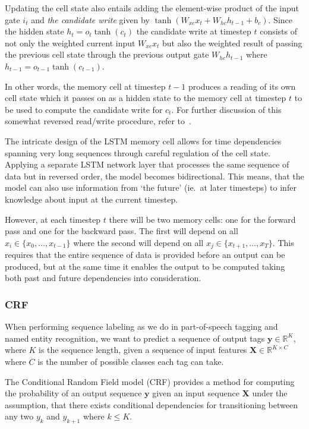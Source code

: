 Updating the cell state also entails adding the element-wise product of the
input gate $i_{t}$ and \textit{the candidate write} given by $\tanh(W_{xc}x_{t}
+ W_{hc}h_{t-1} + b_{c})$. Since the hidden state $h_{t} = o_{t}\tanh(c_{t})$
the candidate write at timestep $t$ consists of not only the weighted current
input $W_{xc}x_{t}$ but also the weighted result of passing the previous cell
state through the previous output gate $W_{hc}h_{t-1}$ where $h_{t-1} =
o_{t-1}\tanh(c_{t-1})$.

In other words, the memory cell at timestep $t-1$ produces a reading of its own
cell state which it passes on as a hidden state to the memory cell at timestep
$t$ to be used to compute the candidate write for $c_{t}$. For further
discussion of this somewhat reversed read/write procedure, refer
to~\cite{pitis2016lstm}.

The intricate design of the LSTM memory cell allows for time dependencies
spanning very long sequences through careful regulation of the cell state.
Applying a separate LSTM network layer that processes the same sequence of data
but in reversed order, the model becomes bidirectional. This means, that the
model can also use information from `the future' (ie.\ at later timesteps) to
infer knowledge about input at the current timestep.

However, at each timestep $t$ there will be two memory cells: one for the
forward pass and one for the backward pass. The first will depend on all $x_{i}
\in \{x_{0}, \ldots, x_{t-1}\}$ where the second will depend on all $x_{j} \in
\{x_{t+1}, \ldots, x_{T}\}$. This requires that the entire sequence of data is
provided before an output can be produced, but at the same time it enables the
output to be computed taking both past and future dependencies into
consideration.


\subsubsection{CRF}\label{sec:setup-models-crf}

When performing sequence labeling as we do in part-of-speech tagging and named
entity recognition, we want to predict a sequence of output tags $\bm{y} \in
\mathbb{R}^{K}$, where $K$ is the sequence length, given a sequence of input
features $\bm{X} \in \mathbb{R}^{K \times C}$ where $C$ is the number of
possible classes each tag can take.

The Conditional Random Field model (CRF) provides a method for computing the
probability of an output sequence $\bm{y}$ given an input sequence $\bm{X}$
under the assumption, that there exists conditional dependencies for
transitioning between any two $y_{k}$ and $y_{k+1}$ where $k \leq K$.

